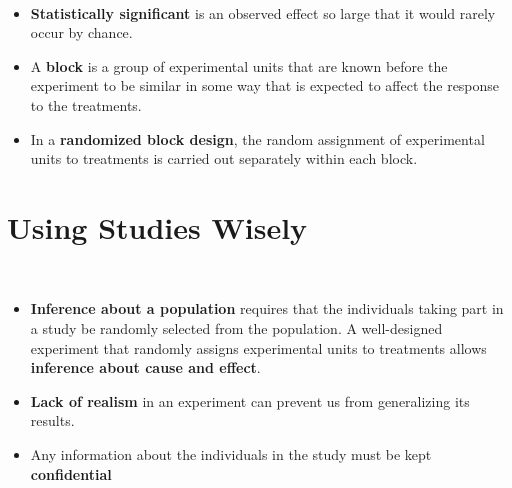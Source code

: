 \documentclass[Main.tex]{subfiles}
\begin{document}
	\begin{exercise} \hfill \\
		\begin{itemize}				
			\item \textbf{Statistically significant} is an observed effect so large that it would rarely occur by chance.  
		\end{itemize}
	\end{exercise}	
	
	\begin{exercise}[Blocking] \hfill \medskip
		\begin{itemize}	
			\item A \textbf{block} is a group of experimental units that are known before the experiment to be similar in some way that is expected to affect the response to the treatments.\\
			\item In a \textbf{randomized block design}, the random assignment of experimental units to treatments is carried out separately within each block.
		\end{itemize}
	\end{exercise}
														
		
	\section{Using Studies Wisely}
	
	\begin{example} \hfill \\
		\begin{itemize}	
			\item \textbf{Inference about a population} requires that the individuals taking part in a study be randomly selected from the population. A well-designed experiment that randomly assigns experimental units to treatments allows \textbf{inference about cause and effect}.\\
			\item \textbf{Lack of realism} in an experiment can prevent us from generalizing its results.\\
			\item Any information about the individuals in the study must be kept \textbf{confidential}
		\end{itemize}
	\end{example}				
\end{document}
